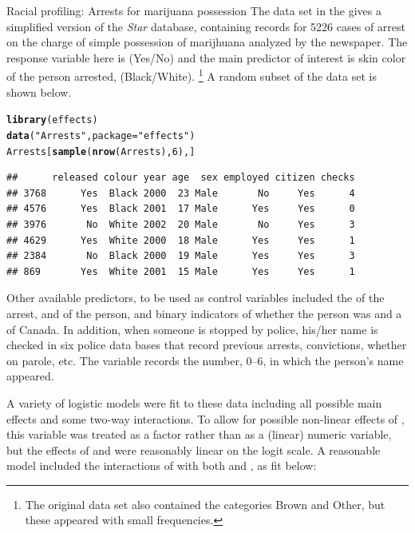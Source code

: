 \documentclass[11pt]{book}\usepackage[]{graphicx}\usepackage[]{color}
\makeatletter
\newcommand{\hlnum}[1]{\textcolor[rgb]{0.686,0.059,0.569}{#1}}%
\newcommand{\hlstr}[1]{\textcolor[rgb]{0.192,0.494,0.8}{#1}}%
\newcommand{\hlstd}[1]{\textcolor[rgb]{0.345,0.345,0.345}{#1}}%
\newcommand{\hlkwc}[1]{\textcolor[rgb]{0.333,0.667,0.333}{#1}}%
\newcommand{\hlkwd}[1]{\textcolor[rgb]{0.737,0.353,0.396}{\textbf{#1}}}%
\newenvironment{kframe}{%
 \def\at@end@of@kframe{}%
 \ifinner\ifhmode%
  \def\at@end@of@kframe{\end{minipage}}%
  \begin{minipage}{\columnwidth}%
 \fi\fi%
 \def\FrameCommand##1{\hskip\@totalleftmargin \hskip-\fboxsep
 \colorbox{shadecolor}{##1}\hskip-\fboxsep
     \hskip-\linewidth \hskip-\@totalleftmargin \hskip\columnwidth}%
 \MakeFramed {\advance\hsize-\width
   \@totalleftmargin\z@ \linewidth\hsize
   \@setminipage}}%
 {\par\unskip\endMakeFramed%
 \at@end@of@kframe}
\newenvironment{knitrout}{}{} %
\renewenvironment{knitrout}{\small\renewcommand{\baselinestretch}{.85}}{} %
\makeatother
\begin{document}
\begin{Example}[arrests]{Racial profiling: Arrests for marijuana possession}
The data set  in the  gives a simplified version
of the \emph{Star} database, containing 
records for 5226 cases of arrest on the charge of simple
possession of marijhuana analyzed by the newspaper.
The response variable here is  (Yes/No)
and the main
predictor of interest is skin color of the person arrested, 
(Black/White).%
\footnote{
The original data set also contained the categories Brown and Other,
but these appeared with small frequencies.
}
A random subset of the data set is shown below.

\begin{knitrout}
\color{fgcolor}\begin{kframe}
\begin{alltt}
\hlkwd{library}\hlstd{(effects)}
\hlkwd{data}\hlstd{(}\hlstr{"Arrests"}\hlstd{,} \hlkwc{package}\hlstd{=}\hlstr{"effects"}\hlstd{)}
\hlstd{Arrests[}\hlkwd{sample}\hlstd{(}\hlkwd{nrow}\hlstd{(Arrests),} \hlnum{6}\hlstd{),]}
\end{alltt}
\begin{verbatim}
##      released colour year age  sex employed citizen checks
## 3768      Yes  Black 2000  23 Male       No     Yes      4
## 4576      Yes  Black 2001  17 Male      Yes     Yes      0
## 3976       No  White 2002  20 Male       No     Yes      3
## 4629      Yes  White 2000  18 Male      Yes     Yes      1
## 2384       No  Black 2000  19 Male      Yes     Yes      3
## 869       Yes  White 2001  15 Male      Yes     Yes      1
\end{verbatim}
\end{kframe}
\end{knitrout}
Other available predictors, to be used as control variables included
the  of the arrest,  and  of the person, and binary indicators
of whether the person was  and a  of Canada.
In addition, when someone is stopped by police, his/her name is checked in six police
data bases that record previous arrests, convictions, whether on parole, etc.
The variable  records the number, 0--6, in which the person's name
appeared.

A variety of logistic models were fit to these data including all possible main effects
and some two-way interactions. To allow for possible non-linear effects of ,
this variable was treated as a factor rather than as a (linear) numeric variable,
but the effects of  and  were reasonably linear on the logit scale.
A reasonable model included the interactions of  with both  and
, as fit below:


\end{Example}
\end{document}
